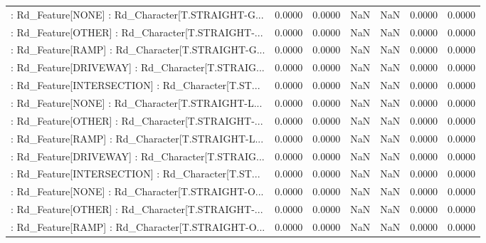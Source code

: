 \begin{longtable}{p{4cm}cccccc}
 : Rd\_Feature[NONE] : Rd\_Character[T.STRAIGHT-G... &            0.0000 &            0.0000 &     NaN &          NaN &             0.0000 &            0.0000 \\
 : Rd\_Feature[OTHER] : Rd\_Character[T.STRAIGHT-... &            0.0000 &            0.0000 &     NaN &          NaN &             0.0000 &            0.0000 \\
 : Rd\_Feature[RAMP] : Rd\_Character[T.STRAIGHT-G... &            0.0000 &            0.0000 &     NaN &          NaN &             0.0000 &            0.0000 \\
 : Rd\_Feature[DRIVEWAY] : Rd\_Character[T.STRAIG... &            0.0000 &            0.0000 &     NaN &          NaN &             0.0000 &            0.0000 \\
 : Rd\_Feature[INTERSECTION] : Rd\_Character[T.ST... &            0.0000 &            0.0000 &     NaN &          NaN &             0.0000 &            0.0000 \\
 : Rd\_Feature[NONE] : Rd\_Character[T.STRAIGHT-L... &            0.0000 &            0.0000 &     NaN &          NaN &             0.0000 &            0.0000 \\
 : Rd\_Feature[OTHER] : Rd\_Character[T.STRAIGHT-... &            0.0000 &            0.0000 &     NaN &          NaN &             0.0000 &            0.0000 \\
 : Rd\_Feature[RAMP] : Rd\_Character[T.STRAIGHT-L... &            0.0000 &            0.0000 &     NaN &          NaN &             0.0000 &            0.0000 \\
 : Rd\_Feature[DRIVEWAY] : Rd\_Character[T.STRAIG... &            0.0000 &            0.0000 &     NaN &          NaN &             0.0000 &            0.0000 \\
 : Rd\_Feature[INTERSECTION] : Rd\_Character[T.ST... &            0.0000 &            0.0000 &     NaN &          NaN &             0.0000 &            0.0000 \\
 : Rd\_Feature[NONE] : Rd\_Character[T.STRAIGHT-O... &            0.0000 &            0.0000 &     NaN &          NaN &             0.0000 &            0.0000 \\
 : Rd\_Feature[OTHER] : Rd\_Character[T.STRAIGHT-... &            0.0000 &            0.0000 &     NaN &          NaN &             0.0000 &            0.0000 \\
 : Rd\_Feature[RAMP] : Rd\_Character[T.STRAIGHT-O... &            0.0000 &            0.0000 &     NaN &          NaN &             0.0000 &            0.0000 \\

\end{longtable}
